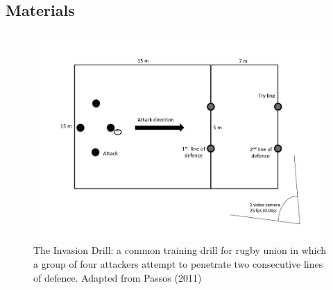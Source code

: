 \subsection{Materials}


\begin{figure}[htbp]
  \centering
      \includegraphics[width=0.9\linewidth,keepaspectratio] {images/invasionDrill}
      \caption{The Invasion Drill: a common training drill for rugby union in which a group of four attackers attempt to penetrate two consecutive lines of defence. Adapted from Passos (2011)}
      \label{fig:invasionDrill}
  \end{figure}


